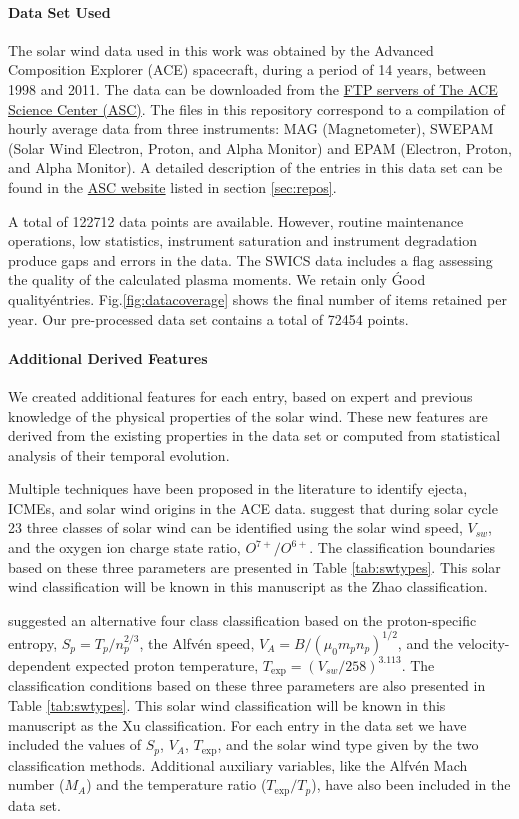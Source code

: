 \paragraph{Data Set Used}
The solar wind data used in this work was obtained by the Advanced Composition Explorer (ACE) spacecraft, during a period of 14 years, between 1998 and 2011. The data can be downloaded from the \href{ftp://mussel.srl.caltech.edu/pub/ace/level2/multi}{FTP servers of The ACE Science Center (ASC)}. The files in this repository correspond to a compilation of hourly average data from three instruments: MAG (Magnetometer), SWEPAM (Solar Wind Electron, Proton, and Alpha Monitor) and EPAM (Electron, Proton, and Alpha Monitor). A detailed description of the entries in this data set can be found in the \href{http://www.srl.caltech.edu/cgi-bin/dib/rundibviewmultil2/ACE/ASC/DATA/level2/multi}{ASC website} listed in section \ref{sec:repos}.

A total of 122712 data points are available. However, routine maintenance operations, low statistics, instrument saturation and instrument degradation produce gaps and errors in the data. The SWICS data includes a flag assessing the quality of the calculated plasma moments. We retain only \'Good quality\' entries. Fig.\ref{fig:datacoverage} shows the final number of items retained per year. Our pre-processed data set contains a total of 72454 points.

\paragraph{Additional Derived Features}
We created additional features for each entry, based on expert and previous knowledge of the physical properties of the solar wind. These new features are derived from the existing properties in the data set or computed from statistical analysis of their temporal evolution.

Multiple techniques have been proposed in the literature to identify ejecta, ICMEs, and solar wind origins in the ACE data. \citep{Zhao2009} suggest that during solar cycle 23 three classes of solar wind can be identified using the solar wind speed, $V_{sw}$, and the oxygen ion charge state ratio, $O^{7+}/O^{6+}$. The classification boundaries based on these three parameters are presented in Table \ref{tab:swtypes}. This solar wind classification will be known in this manuscript as the Zhao classification.

\citep{Xu2015} suggested an alternative four class classification based on the proton-specific entropy, $S_p = T_p/n_p^{2/3}$, the Alfv\'en speed, $V_A = B / (\mu_0 m_p n_p)^{1/2}$, and the velocity-dependent expected proton temperature, $T_\text{exp} = (V_{sw}/258)^{3.113}$. The classification conditions based on these three parameters are also presented in Table \ref{tab:swtypes}. This solar wind classification will be known in this manuscript as the Xu classification. For each entry in the data set we have included the values of $S_p$, $V_A$, $T_\text{exp}$, and the solar wind type given by the two classification methods. Additional auxiliary variables, like the Alfv\'en Mach number ($M_A$) and the temperature ratio ($T_\text{exp}/T_p$), have also been included in the data set.

